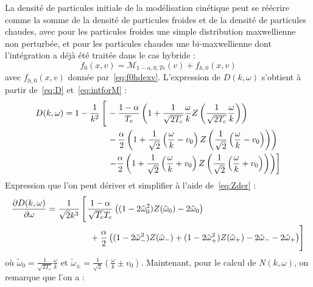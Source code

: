La densité de particules initiale de la modélisation cinétique peut se réécrire comme la somme de la densité de particules froides et de la densité de particules chaudes, avec pour les particules froides une simple distribution maxwellienne non perturbée, et pour les particules chaudes une bi-maxwellienne dont l'intégration a déjà été traitée dans le cas hybride :
\begin{equation}
  f_0(x,v) = \mathcal{M}_{1-\alpha,0,Tc}(v) + f_{h,0}(x,v)
 \label{init_f0_rel_disp} 
\end{equation}
avec $f_{h,0}(x,v)$ donnée par~\eqref{eq:f0hdexv}. L'expression de $D(k,\omega)$ s'obtient à partir de~\eqref{eq:D} et~\eqref{eq:intforM} :
\begin{equation}
  \begin{aligned}
    D(k,\omega) = 1 - \frac{1}{k^2}\left[\vphantom{\frac{}{\sqrt{}}}\right. & -\frac{1-\alpha}{T_c}\left( 1 + \frac{1}{\sqrt{2T_c}}\frac{\omega}{k}Z\left( \frac{1}{\sqrt{2T_c}}\frac{\omega}{k}\right) \right) \\
                                          & -\frac{\alpha}{2}\left( 1 + \frac{1}{\sqrt{2}}\left(\frac{\omega}{k}-v_0\right)Z\left(\frac{1}{\sqrt{2}}\left(\frac{\omega}{k}-v_0\right)\right) \right) \\
                                          & \left. -\frac{\alpha}{2}\left( 1 + \frac{1}{\sqrt{2}}\left(\frac{\omega}{k}+v_0\right)Z\left(\frac{1}{\sqrt{2}}\left(\frac{\omega}{k}+v_0\right)\right) \right)  \right]
  \end{aligned}
    \label{D_3bump}
\end{equation}
Expression que l'on peut dériver et simplifier à l'aide de~\eqref{eq:Zder} :
\begin{equation}
  \begin{aligned}
    \frac{\partial D(k,\omega)}{\partial\omega} = \frac{1}{\sqrt{2}k^3}\left[\vphantom{\frac{}{\sqrt{}}}\right.
        & \frac{1-\alpha}{\sqrt{T_c}T_c}\left( (1-2\tilde{\omega}_0^2)Z(\tilde{\omega}_0) - 2\tilde{\omega}_0 \right) \\
        & \left.\vphantom{\frac{}{\sqrt{}}} +\frac{\alpha}{2}\left( (1-2\tilde{\omega}_-^2)Z(\tilde{\omega}_-) + (1-2\tilde{\omega}_+^2)Z(\tilde{\omega}_+) - 2\tilde{\omega}_- - 2\tilde{\omega}_+ \right) \right]
  \end{aligned}
  \label{eq:3bumpderD}
\end{equation}
où $\tilde{\omega}_0 = \frac{1}{\sqrt{2T_c}}\frac{\omega}{k}$ et $\tilde{\omega}_\pm = \frac{1}{\sqrt{2}}(\frac{\omega}{k}\pm v_0)$. Maintenant, pour le calcul de $N(k,\omega)$, on remarque que l'on a :
